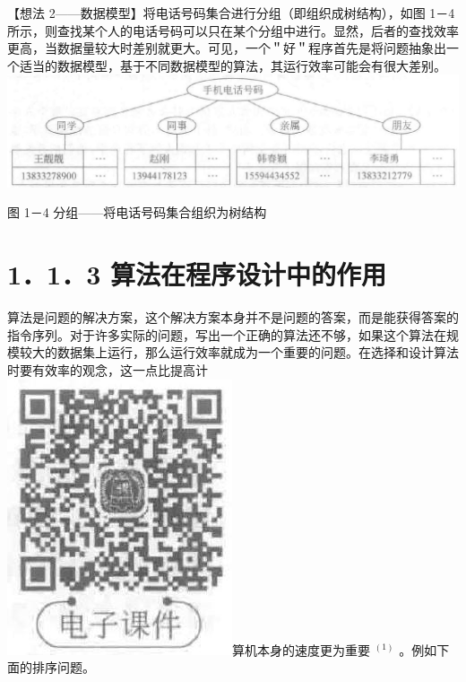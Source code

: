 \documentclass[10pt]{article}
\begin{document}
【想法 2——数据模型】将电话号码集合进行分组（即组织成树结构），如图 1－4 所示，则查找某个人的电话号码可以只在某个分组中进行。显然，后者的查找效率更高，当数据量较大时差别就更大。可见，一个＂好＂程序首先是将问题抽象出一个适当的数据模型，基于不同数据模型的算法，其运行效率可能会有很大差别。\\
\includegraphics[max width=\textwidth, center]{2025_06_06_704745ea57b15b2333e5g-019(1)}

图 1－4 分组——将电话号码集合组织为树结构

\section*{1．1．3 算法在程序设计中的作用}
算法是问题的解决方案，这个解决方案本身并不是问题的答案，而是能获得答案的指令序列。对于许多实际的问题，写出一个正确的算法还不够，如果这个算法在规模较大的数据集上运行，那么运行效率就成为一个重要的问题。在选择和设计算法时要有效率的观念，这一点比提高计\\
\includegraphics[max width=\textwidth]{2025_06_06_704745ea57b15b2333e5g-019}算机本身的速度更为重要 ${ }^{(1)}$ 。例如下面的排序问题。
\end{document}
